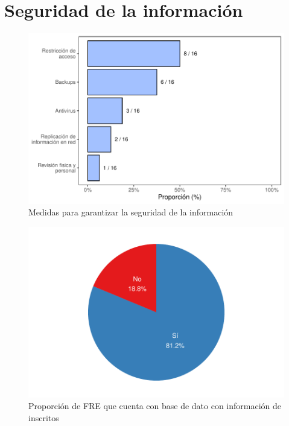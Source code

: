 \documentclass[
]{book}
\begin{document}
\hypertarget{seguridad-de-la-informaciuxf3n}{%
\section{Seguridad de la información}\label{seguridad-de-la-informaciuxf3n}}

\begin{figure}
\includegraphics[width=0.85\linewidth]{InformeFinal_files/figure-latex/GarantiaInformacion-1} \caption{Medidas para garantizar la seguridad de la información}\label{fig:GarantiaInformacion}
\end{figure}
\begin{figure}
\includegraphics[width=0.85\linewidth]{InformeFinal_files/figure-latex/InformInscritos-1} \caption{Proporción de FRE que cuenta con base de dato con información de inscritos}\label{fig:InformInscritos}
\end{figure}
\end{document}
